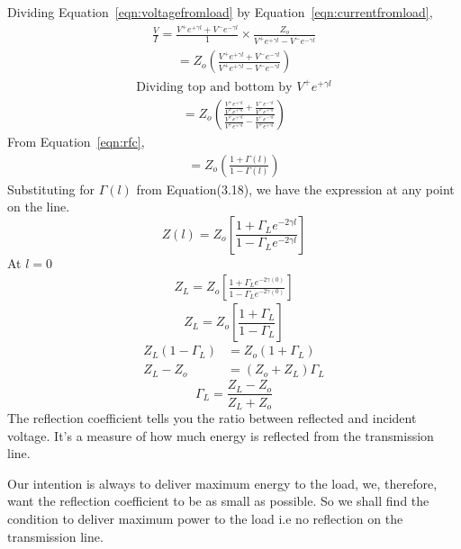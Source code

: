 Dividing Equation~\ref{eqn:voltagefromload} by Equation~\ref{eqn:currentfromload},
\begin{align*}
\frac{V}{I} = \frac{V^+e^{+\gamma l}+V^-e^{-\gamma l}}{1}\times \frac{Z_o}{V^+e^{+\gamma l}-V^-e^{-\gamma l}}
\end{align*}
\begin{align*}
= Z_o\left( \frac{V^+e^{+\gamma l}+V^-e^{-\gamma l}}{V^+e^{+\gamma l}-V^-e^{-\gamma l}}\right) 
\end{align*}
\begin{align*}
\text{Dividing top and bottom by }V^+e^{+\gamma l}
\end{align*}
\begin{align*}
= Z_o\left( \frac{\frac{V^+e^{+\gamma l}}{V^+e^{+\gamma l}}+\frac{V^-e^{-\gamma l}}{V^+e^{+\gamma l}}}{\frac{V^+e^{+\gamma l}}{V^+e^{+\gamma l}}-\frac{V^-e^{-\gamma l}}{V^+e^{+\gamma l}}}\right) 
\end{align*}
From Equation~\ref{eqn:rfc},
\begin{align*}
=Z_o\left( \frac{1+\Gamma (l)}{1 -\Gamma (l)}\right) 
\end{align*}
Substituting for $\Gamma (l)$ from Equation(3.18), we have the expression at any point on the line.
\begin{equation}
Z(l) = Z_o\left[ \frac{1 + \Gamma_L e^{-2\gamma l}}{1 - \Gamma_L e^{-2\gamma l}}\right] 
\end{equation}
At $l = 0$ 
\begin{align*}
Z_L = Z_o\left[ \frac{1 + \Gamma_L e^{-2\gamma (0)}}{1 - \Gamma_L e^{-2\gamma (0)}}\right] 
\end{align*}
\begin{equation}
Z_L = Z_o\left[\frac{1 + \Gamma_L}{1 - \Gamma_L}\right] 
\end{equation}
\begin{align*}
Z_L(1 - \Gamma_L) &= Z_o(1 + \Gamma_L)\\
Z_L - Z_o &= (Z_o + Z_L)\Gamma_L
\end{align*}
\begin{equation}
\Gamma_L = \frac{Z_L - Z_o}{Z_L + Z_o}
\end{equation}
The reflection coefficient tells you the ratio between reflected and incident voltage. It's a measure of how much energy is reflected from the transmission line.

Our intention is always to deliver maximum energy to the load, we, therefore, want the reflection coefficient to be as small as possible. So we shall find the condition to deliver maximum power to the load i.e no reflection on the transmission line.

